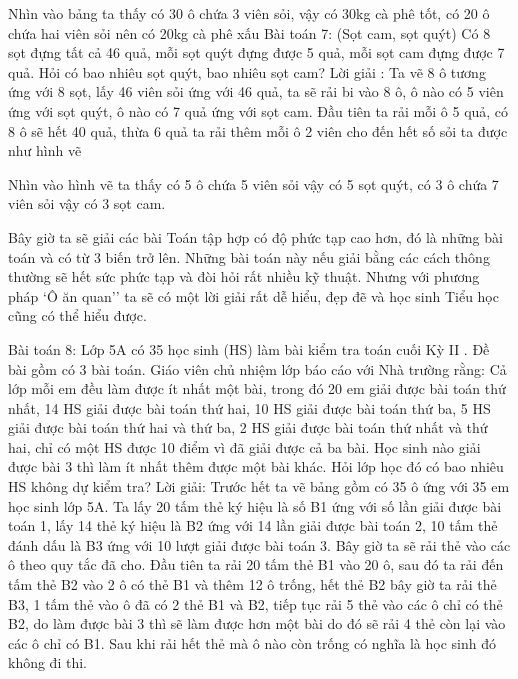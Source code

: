 \begin{multicols}{2}
	
	
	
	
	
	
	
	
	
	
	
	
	
	
	
	
	
	
	
	
	
	
	
	Nhìn vào bảng ta thấy có 30 ô chứa 3 viên sỏi, vậy có 30kg cà phê tốt, có 20 ô chứa hai viên sỏi nên có 20kg cà phê xấu
	Bài toán 7: (Sọt cam, sọt quýt)
	Có 8 sọt đựng tất cả 46 quả, mỗi sọt quýt đựng được 5 quả, mỗi sọt cam đựng được 7 quả. Hỏi có bao nhiêu sọt quýt, bao nhiêu sọt cam?
	Lời giải :
	Ta vẽ 8 ô tương ứng với 8 sọt, lấy 46 viên sỏi ứng với 46 quả, ta sẽ rải bi vào 8 ô, ô nào có 5 viên ứng với sọt quýt, ô nào có 7 quả ứng với sọt cam. Đầu tiên ta rải mỗi ô 5 quả, có 8 ô sẽ hết 40 quả, thừa 6 quả ta rải thêm mỗi ô 2 viên cho đến hết số sỏi ta được như hình vẽ
	
	Nhìn vào hình vẽ ta thấy có 5 ô chứa 5 viên sỏi vậy có 5 sọt quýt, có 3 ô chứa 7 viên sỏi vậy có
	3 sọt cam.
	
	Bây giờ ta sẽ giải các bài Toán tập hợp có độ phức tạp cao hơn, đó là những bài toán và có từ 3 biến trở lên. Những bài toán này nếu giải bằng các cách thông thường sẽ hết sức phức tạp và đòi hỏi rất nhiều kỹ thuật. Nhưng với phương pháp ‘Ô ăn quan’’ ta sẽ có một lời giải rất dễ hiểu, đẹp đẽ và học sinh Tiểu học cũng có thể hiểu được.
	
	Bài toán 8: Lớp 5A có 35 học sinh (HS) làm bài kiểm tra toán cuối Kỳ II . Đề bài gồm có 3 bài toán. Giáo viên chủ nhiệm lớp báo cáo với Nhà trường rằng: Cả lớp mỗi em đều làm được ít nhất một bài, trong đó 20 em giải được bài toán thứ nhất, 14 HS giải được bài toán thứ hai, 10 HS giải được bài toán thứ ba, 5 HS giải được bài toán thứ hai và thứ ba, 2 HS giải được bài toán thứ nhất và thứ hai, chỉ có một HS được 10 điểm vì đã giải được cả ba bài. Học sinh nào giải được bài 3 thì làm ít nhất thêm được một bài khác.
	Hỏi lớp học đó có bao nhiêu HS không dự kiểm tra?
	Lời giải:
	Trước hết ta vẽ bảng gồm có 35 ô ứng với 35 em học sinh lớp 5A. Ta lấy 20 tấm thẻ ký hiệu là số B1 ứng với số lần giải được bài toán 1, lấy 14 thẻ ký hiệu là B2 ứng với 14 lần giải được bài toán 2, 10 tấm thẻ đánh dấu là B3 ứng với 10 lượt giải được bài toán 3. Bây giờ ta sẽ rải thẻ vào các ô theo quy tắc đã cho. Đầu tiên ta rải 20 tấm thẻ B1 vào 20 ô, sau đó ta rải đến tấm thẻ B2 vào 2 ô có thẻ B1 và thêm 12 ô trống, hết thẻ B2 bây giờ ta rải thẻ B3, 1 tấm thẻ vào ô đã có 2 thẻ B1 và B2, tiếp tục rải 5 thẻ vào các ô chỉ có thẻ B2, do làm được bài 3 thì sẽ làm được hơn một bài do đó sẽ rải 4 thẻ còn lại vào các ô chỉ có B1. Sau khi rải hết thẻ mà ô nào còn trống có nghĩa là học sinh đó không đi thi.
	

\end{multicols}
